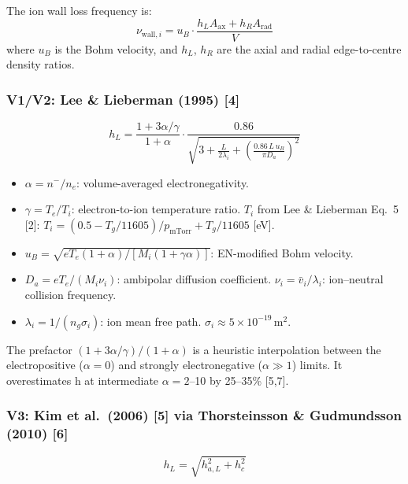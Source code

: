 \documentclass[11pt,a4paper]{article}
\begin{document}
The ion wall loss frequency is:
\begin{equation}\label{eq:ionwall}
\nu_{\text{wall},i} = u_B \cdot \frac{h_L A_\text{ax} + h_R A_\text{rad}}{V}
\end{equation}
where $u_B$ is the Bohm velocity, and $h_L$, $h_R$ are the axial and radial edge-to-centre density ratios.

\subsubsection{V1/V2: Lee \& Lieberman (1995) [4]}

\begin{equation}\label{eq:hLL}
h_L = \frac{1+3\alpha/\gamma}{1+\alpha} \cdot \frac{0.86}{\sqrt{3 + \frac{L}{2\lambda_i} + \left(\frac{0.86\,L\,u_B}{\pi D_a}\right)^2}}
\end{equation}

\begin{itemize}[nosep]
\item $\alpha = n^-/n_e$: volume-averaged electronegativity.
\item $\gamma = T_e/T_i$: electron-to-ion temperature ratio. $T_i$ from Lee \& Lieberman Eq.~5 [2]: $T_i = (0.5 - T_g/11605)/p_\text{mTorr} + T_g/11605$ [eV].
\item $u_B = \sqrt{eT_e(1+\alpha)/[M_i(1+\gamma\alpha)]}$: EN-modified Bohm velocity.
\item $D_a = eT_e/(M_i\nu_i)$: ambipolar diffusion coefficient. $\nu_i = \bar{v}_i/\lambda_i$: ion--neutral collision frequency.
\item $\lambda_i = 1/(n_g\sigma_i)$: ion mean free path. $\sigma_i \approx 5\times10^{-19}$\,m$^2$.
\end{itemize}

The prefactor $(1+3\alpha/\gamma)/(1+\alpha)$ is a heuristic interpolation between the electropositive ($\alpha=0$) and strongly electronegative ($\alpha\gg1$) limits. It overestimates h at intermediate $\alpha = 2$--10 by 25--35\% [5,7].

\subsubsection{V3: Kim et al.\ (2006) [5] via Thorsteinsson \& Gudmundsson (2010) [6]}

\begin{equation}\label{eq:hkim}
\boxed{h_L = \sqrt{h_{a,L}^2 + h_c^2}}
\end{equation}
\end{document}
